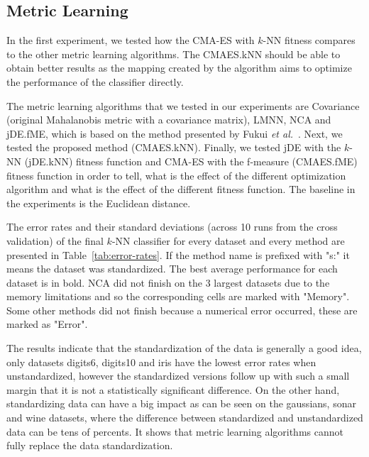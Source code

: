 


\subsection{Metric Learning}
\label{chap:exp:classification}

In the first experiment, we tested how the CMA-ES with $k$-NN fitness compares to the other metric learning algorithms. The CMAES.kNN should be able to obtain better results as the mapping created by the algorithm aims to optimize the performance of the classifier directly. 

The metric learning algorithms that we tested in our experiments are Covariance (original Mahalanobis metric with a covariance matrix), LMNN, NCA and jDE.fME, which is based on the method presented by Fukui \emph{et al.}~\cite{fukui2013evolutionary}. Next, we tested the proposed method (CMAES.kNN). Finally, we tested jDE with the $k$-NN (jDE.kNN) fitness function and CMA-ES with the f-measure (CMAES.fME) fitness function in order to tell, what is the effect of the different optimization algorithm and what is the effect of the different fitness function. The baseline in the experiments is the Euclidean distance.

The error rates and their standard deviations (across 10 runs from the cross validation) of the final $k$-NN classifier for every dataset and every method are presented in Table~\ref{tab:error-rates}. If the method name is prefixed with "s:" it means the dataset was standardized. The best average performance for each dataset is in bold. NCA did not finish on the 3 largest datasets due to the memory limitations and so the corresponding cells are marked with "Memory". Some other methods did not finish because a numerical error occurred, these are marked as "Error".



The results indicate that the standardization of the data is generally a good idea, only datasets digits6, digits10 and iris have the lowest error rates when unstandardized, however the standardized versions follow up with such a small margin that it is not a statistically significant difference. On the other hand, standardizing data can have a big impact as can be seen on the gaussians, sonar and wine datasets, where the difference between standardized and unstandardized data can be tens of percents. It shows that metric learning algorithms cannot fully replace the data standardization.

